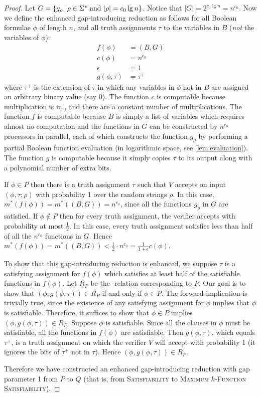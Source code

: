 \documentclass[]{article}
\begin{document}
\begin{proof}
  Let $G = \left\{g_\rho \,\middle|\, \rho \in \Sigma^* \textnormal{ and } |\rho| = c_0 \lg n \right\}$.
  Notice that $|G| = 2^{c_0 \lg n} = n^{c_0}$.
  Now we define the enhanced gap-introducing reduction as follows for all Boolean formulae $\phi$ of length $n$, and all truth assignments $\tau$ to the variables in $B$ (\emph{not} the variables of $\phi$):
  \begin{align*}
    f(\phi) & = (B, G) \\
    c(\phi) & = n^{c_0} \\
    \epsilon & = 1 \\
    g(\phi, \tau) & = \tau^+
  \end{align*}
  where $\tau^+$ is the extension of $\tau$ in which any variables in $\phi$ not in $B$ are assigned an arbitrary binary value (say 0).
  The function $c$ is \NC{} computable because multiplication is in \NC{}, and there are a constant number of multiplications.
  The function $f$ is \NC{} computable because $B$ is simply a list of variables which requires almost no computation and the functions in $G$ can be constructed by $n^{c_0}$ processors in parallel, each of which constructs the function $g_\rho$ by performing a partial Boolean function evaluation (in logarithmic space, see \autoref{lem:evaluation}).
  The function $g$ is \NC{} computable because it simply copies $\tau$ to its output along with a polynomial number of extra bits.

  If $\phi \in P$ then there is a truth assignment $\tau$ such that $V$ accepts on input $(\phi, \tau; \rho)$ with probability 1 over the random strings $\rho$.
  In this case, $m^*(f(\phi)) = m^*((B, G)) = n^{c_0}$, since all the functions $g_\rho$ in $G$ are satisfied.
  If $\phi \notin P$ then for every truth assignment, the verifier accepts with probability at most $\frac{1}{2}$.
  In this case, every truth assignment satisfies less than half of all the $n^{c_0}$ functions in $G$.
  Hence $m^*(f(\phi)) = m^*((B, G)) < \frac{1}{2} \cdot n^{c_0} = \frac{1}{1 + \epsilon} c(\phi)$.
  
  To show that this gap-introducing reduction is enhanced, we suppose $\tau$ is a satisfying assignment for $f(\phi)$ which satisfies at least half of the satisfiable functions in $f(\phi)$.
  Let $R_P$ be the \NP-relation corresponding to $P$.
  Our goal is to show that $(\phi, g(\phi, \tau)) \in R_P$ if and only if $\phi \in P$.
  The forward implication is trivially true, since the existence of any satisfying assignment for $\phi$ implies that $\phi$ is satisfiable.
  Therefore, it suffices to show that $\phi \in P$ implies $(\phi, g(\phi, \tau)) \in R_P$.
  Suppose $\phi$ is satisfiable.
  Since all the clauses in $\phi$ must be satisfiable, all the functions in $f(\phi)$ are satisfiable.
  Then $g(\phi, \tau)$, which equals $\tau^+$, is a truth assignment on which the verifier $V$ will accept with probability 1 (it ignores the bits of $\tau^+$ not in $\tau$).
  Hence $(\phi, g(\phi, \tau)) \in R_P$.

  Therefore we have constructed an \NC{} enhanced gap-introducing reduction with gap parameter 1 from $P$ to $Q$ (that is, from \textsc{Satisfiability} to \textsc{Maximum $k$-Function Satisfiability}).
\end{proof}
\end{document}
